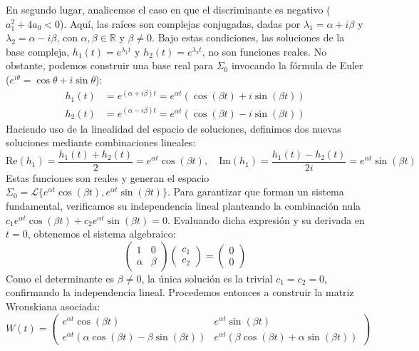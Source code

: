 {    En segundo lugar, analicemos el caso en que el discriminante es negativo ($a_1^2 + 4a_0 < 0$). Aquí, las raíces son complejas conjugadas, dadas por $\lambda_1 = \alpha + i \beta$ y $\lambda_2 = \alpha - i \beta$, con $\alpha, \beta \in \mathbb{R}$ y $\beta \neq 0$. Bajo estas condiciones, las soluciones de la base compleja, $h_1(t) = e^{\lambda_1 t}$ y $h_2(t) = e^{\lambda_2 t}$, no son funciones reales. No obstante, podemos construir una base real para $\Sigma_0$ invocando la fórmula de Euler ($e^{i\theta} = \cos\theta + i\sin\theta$):
    \begin{align*}
        h_1(t) &= e^{(\alpha + i \beta) t} = e^{\alpha t} (\cos(\beta t) + i \sin(\beta t)) \\
        h_2(t) &= e^{(\alpha - i \beta) t} = e^{\alpha t} (\cos(\beta t) - i \sin(\beta t))
    \end{align*}
    Haciendo uso de la linealidad del espacio de soluciones, definimos dos nuevas soluciones mediante combinaciones lineales:
    \[
        \text{Re}(h_1) = \frac{h_1(t) + h_2(t)}{2} = e^{\alpha t} \cos(\beta t), \quad \text{Im}(h_1) = \frac{h_1(t) - h_2(t)}{2i} = e^{\alpha t} \sin(\beta t)
    \]
    Estas funciones son reales y generan el espacio $\Sigma_0 = \mathcal{L}\{e^{\alpha t} \cos(\beta t), e^{\alpha t} \sin(\beta t)\}$. Para garantizar que forman un sistema fundamental, verificamos su independencia lineal planteando la combinación nula $c_1 e^{\alpha t} \cos(\beta t) + c_2 e^{\alpha t} \sin(\beta t) = 0$. Evaluando dicha expresión y su derivada en $t=0$, obtenemos el sistema algebraico:
    \[
        \begin{pmatrix}
            1 & 0 \\
            \alpha & \beta
        \end{pmatrix} \begin{pmatrix}
            c_1 \\
            c_2
        \end{pmatrix} = \begin{pmatrix}
            0 \\
            0
        \end{pmatrix}
    \]
    Como el determinante es $\beta \neq 0$, la única solución es la trivial $c_1 = c_2 = 0$, confirmando la independencia lineal. Procedemos entonces a construir la matriz Wronskiana asociada:
    \[
        W(t) = \begin{pmatrix}
            e^{\alpha t} \cos(\beta t) & e^{\alpha t} \sin(\beta t) \\
            e^{\alpha t}(\alpha \cos(\beta t) - \beta \sin(\beta t)) & e^{\alpha t}(\beta \cos(\beta t) + \alpha \sin(\beta t))

\end{pmatrix}\]}

